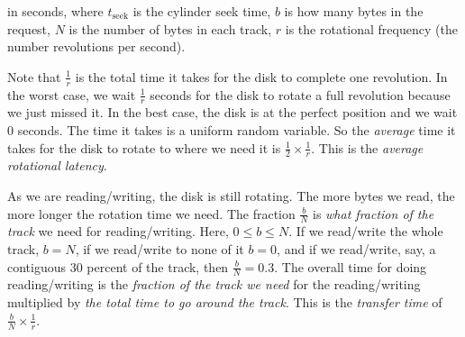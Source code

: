 
in seconds, where $t_{\text{seek}}$ is the cylinder seek time,
$b$ is how many bytes in the request, $N$ is the number of bytes in each track, 
$r$ is the rotational frequency (the number revolutions per second).

Note that $\frac{1}{r}$ is the total time it takes for the disk to complete one revolution. 
In the worst case, we wait $\frac{1}{r}$ seconds for the disk to rotate a full revolution 
because we just missed it. In the best case, the disk is at the perfect position and we 
wait 0 seconds. The time it takes is a uniform random variable. So the \textit{average} time 
it takes for the disk to rotate to where we need it is  
$\frac{1}{2} \times \frac{1}{r}$. This is the \textit{average rotational latency}. 

As we are reading/writing, the disk is still rotating. 
The more bytes we read, the more longer the rotation time we 
need. The fraction $\frac{b}{N}$ is \textit{what fraction of the track} we need for 
reading/writing. Here, $0 \leqslant b \leqslant N$. If we read/write the whole track, $b = N$, 
if we read/write to none of it $b = 0$, and if we 
read/write, say, a contiguous 30 percent of the track, then $\frac{b}{N} = 0.3$. 
The overall time for doing reading/writing is the \textit{fraction of the track we need} 
for the reading/writing multiplied by \textit{the total time to go around the track}.
This is the \textit{transfer time} of $\frac{b}{N} \times \frac{1}{r}$. 

\frmrule


